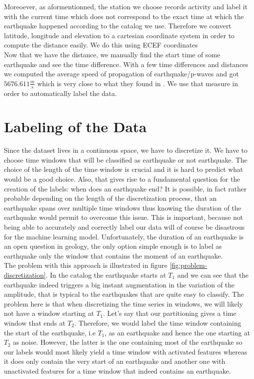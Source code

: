 \documentclass[10pt,conference,compsocconf]{IEEEtran}
\begin{document}
Moreoever, as aformentionned, the station we choose records activity and label it with the current time which does not correspond to the exact time at which the earthquake happened according to the catalog we use. Therefore we convert latitude, longitude and elevation to a cartesian coordinate system in order to compute the distance easily. We do this using ECEF coordinates\cite{ECEFPaper}\\
Now that we have the distance, we manually find the start time of some earthquake and see the time difference. With a few time differences and distances we computed the average speed of propagation of earthquake/p-waves and got $5676.611\frac{m}{s}$ which is very close to what they found in \cite{PWavePaper}. We use that measure in order to automatically label the data.

\section{Labeling of the Data}
Since the dataset lives in a continuous space, we have to discretize it. We have to choose time windows that will be classified as earthquake or not earthquake. The choice of the length of the time window is crucial and it is hard to predict what would be a good choice. Also, that gives rise to a fundamental question for the creation of the labels: when does an earthquake end? It is possible, in fact rather probable depending on the length of the discretization process, that an earthquake spans over multiple time windows thus knowing the duration of the earthquake would permit to overcome this issue. This is important, because not being able to accurately and correctly label our data will of course be disastrous for the machine learning model. Unfortunately, the duration of an earthquake is an open question in geology, the only option simple enough is to label as earthquake only the window that contains the moment of an earthquake.\\
The problem with this approach is illustrated in figure \ref{fig:problem-discretization}. In the catalog the earthquake starts at $T_1$ and we can see that the earthquake indeed triggers a big instant augmentation in the variation of the amplitude, that is typical to the earthquakes that are quite easy to classify. The problem here is that when discretizing the time series in windows, we will likely not have a window starting at $T_1$. Let's say that our partitioning gives a time window that ends at $T_2$. Therefore, we would label the time window containing the start of the earthquake, i.e $T_1$, as an earthquake and hence the one starting at $T_2$ as noise. However, the latter is the one containing most of the earthquake so our labels would most likely yield a time window with activated features whereas it does only contain the very start of an earthquake and another one with unactivated features for a time window that indeed contains an earthquake.
\end{document}
